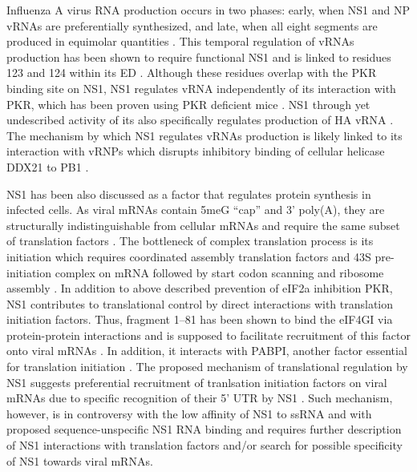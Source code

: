 		Influenza A virus RNA production occurs in two phases: early, when \gls{NS1} and \gls{NP} vRNAs are preferentially synthesized, and late, when all eight segments are produced in equimolar quantities \parencite{Shapiro1987, Skehel1973}. This temporal regulation of vRNAs production has been shown to require functional \gls{NS1} \parencite{Falcon2004} and is linked to residues 123 and 124 within its ED \parencite{Min2007}. Although these residues overlap with the \gls{PKR} binding site on NS1, NS1 regulates vRNA independently of its interaction with PKR, which has been proven using PKR deficient mice \parencite{Min2007}. NS1 through yet undescribed activity of its also specifically regulates production of HA vRNA \parencite{Maamary2012}. The mechanism by which NS1 regulates vRNAs production is likely linked to its interaction with \gls{vRNP}s which disrupts inhibitory binding of cellular helicase DDX21 to PB1 \parencite{Marion1997a, Chen2014}.
		
		\gls{NS1} has been also discussed as a factor that regulates protein synthesis in infected cells. As viral mRNAs contain \gls{5meG} ``cap'' and 3' poly(A), they are structurally indistinguishable from cellular mRNAs and require the same subset of translation factors \parencite{Poch1989, Poon1999}. The bottleneck of complex translation process is its initiation which requires coordinated assembly translation factors and 43S pre-initiation complex on mRNA followed by start codon scanning and ribosome assembly \parencite{Pestova2001}. In addition to above described prevention of \gls{eIF2a} inhibition \gls{PKR}, \gls{NS1} contributes to translational control by direct interactions with translation initiation factors. Thus, fragment 1--81 has been shown to bind the \gls{eIF4GI} via protein-protein interactions and is supposed to facilitate recruitment of this factor onto viral mRNAs \parencite{Aragon2000}. In addition, it interacts with \gls{PABP}I, another factor essential for translation initiation \parencite{Burgui2003}. The proposed mechanism of translational regulation by \gls{NS1} suggests preferential recruitment of tranlsation initiation factors on viral mRNAs due to specific recognition of their 5' \gls{UTR} by NS1 \parencite{DelaLuna1995}. Such mechanism, however, is in controversy with the low affinity of NS1 to ssRNA and with proposed sequence-unspecific NS1 RNA binding \parencite{Hatada1992} and requires further description of NS1 interactions with translation factors and/or search for possible specificity of NS1 towards viral mRNAs.
	
